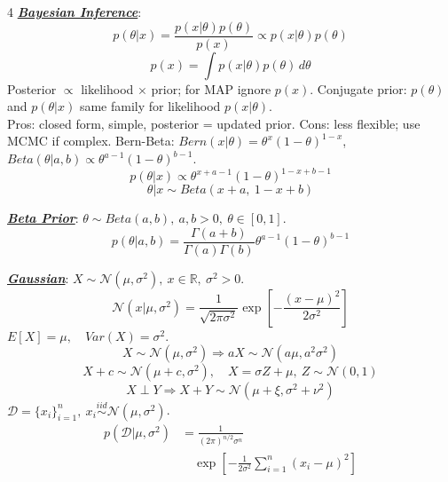 \documentclass[12pt]{article}
\newcommand{\bulletPoint}[1]{\ul{\textit{\textbf{#1}}}}
\begin{document}
\begin{multicols*}{4}
\bulletPoint{Bayesian Inference}:
\useshortskip \begin{equation*}
    p(\theta|x)=\frac{p(x|\theta)p(\theta)}{p(x)}\propto p(x|\theta)p(\theta)
\end{equation*}
\useshortskip \begin{equation*}
    p(x)=\int p(x|\theta)p(\theta)\,d\theta
\end{equation*}
Posterior $\propto$ likelihood $\times$ prior; for MAP ignore $p(x)$.
Conjugate prior: $p(\theta)$ and $p(\theta|x)$ same family for likelihood $p(x|\theta)$.\\
Pros: closed form, simple, posterior = updated prior. Cons: less flexible; use MCMC if complex.
Bern-Beta: $Bern(x|\theta)=\theta^x(1-\theta)^{1-x}$,
$Beta(\theta|a,b)\propto\theta^{a-1}(1-\theta)^{b-1}$.
\useshortskip \begin{equation*}
    p(\theta|x)\propto\theta^{x+a-1}(1-\theta)^{1-x+b-1}
\end{equation*}
\useshortskip \begin{equation*}
    \theta|x\sim Beta(x+a,\ 1-x+b)
\end{equation*}

\bulletPoint{Beta Prior}:
$\theta\sim Beta(a,b),\ a,b>0,\ \theta\in[0,1]$.
\useshortskip \begin{equation*}
    p(\theta|a,b)=\frac{\Gamma(a+b)}{\Gamma(a)\Gamma(b)}
    \theta^{a-1}(1-\theta)^{b-1}
\end{equation*}

\bulletPoint{Gaussian}:
$X\sim\mathcal{N}(\mu,\sigma^2),\ x\in\mathbb{R},\ \sigma^2>0$.
\useshortskip \begin{equation*}
    \mathcal{N}(x|\mu,\sigma^2)=\frac{1}{\sqrt{2\pi\sigma^2}}
    \exp\!\left[-\frac{(x-\mu)^2}{2\sigma^2}\right]
\end{equation*}
$E[X]=\mu,\quad Var(X)=\sigma^2$.
\useshortskip \begin{equation*}
    X\sim\mathcal{N}(\mu,\sigma^2)\Rightarrow aX\sim\mathcal{N}(a\mu,a^2\sigma^2)
\end{equation*}
\useshortskip \begin{equation*}
    \scriptstyle X+c\sim\mathcal{N}(\mu+c,\sigma^2),\quad X=\sigma Z+\mu,\ Z\sim\mathcal{N}(0,1)
\end{equation*}
\useshortskip \begin{equation*}
    X\perp Y\Rightarrow X+Y\sim\mathcal{N}(\mu+\xi,\sigma^2+\nu^2)
\end{equation*}
$\mathcal{D}=\{x_i\}_{i=1}^n,\ x_i\overset{iid}{\sim}\mathcal{N}(\mu,\sigma^2)$.
\useshortskip \begin{equation*}
    \begin{split}
        \scriptstyle p(\mathcal{D}|\mu,\sigma^2)
        &=\scriptstyle \frac{1}{(2\pi)^{n/2}\sigma^n}\\
        &\scriptstyle \quad\exp\!\left[-\frac{1}{2\sigma^2}\sum_{i=1}^n(x_i-\mu)^2\right]
    \end{split}
\end{equation*}


\end{multicols*}
\end{document}
